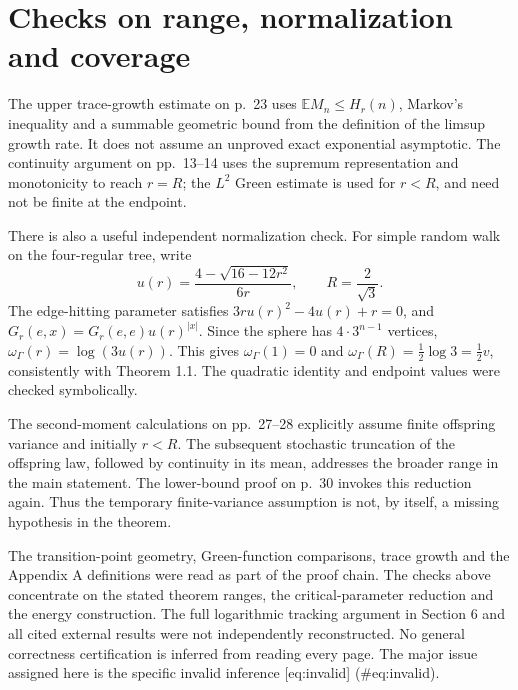 \documentclass[10pt]{article}
\begin{document}
\section*{Checks on range, normalization and coverage}
The upper trace-growth estimate on p. 23 uses \(\mathbb EM_n\leq H_r(n)\), Markov’s inequality and a summable geometric bound from the definition of the limsup growth rate. It does not assume an unproved exact exponential asymptotic. The continuity argument on pp. 13–14 uses the supremum representation and monotonicity to reach \(r=R\); the \(L^2\) Green estimate is used for \(r<R\), and need not be finite at the endpoint.\par
There is also a useful independent normalization check. For simple random walk on the four-regular tree, write \[u(r)=\frac{4-\sqrt{16-12r^2}}{6r},\qquad R=\frac2{\sqrt3}.\] The edge-hitting parameter satisfies \(3ru(r)^2-4u(r)+r=0\), and \(G_r(e,x)=G_r(e,e)u(r)^{|x|}\). Since the sphere has \(4\cdot3^{n-1}\) vertices, \(\omega_\Gamma(r)=\log(3u(r))\). This gives \(\omega_\Gamma(1)=0\) and \(\omega_\Gamma(R)=\frac12\log3=\frac12v\), consistently with Theorem 1.1. The quadratic identity and endpoint values were checked symbolically.\par
The second-moment calculations on pp. 27–28 explicitly assume finite offspring variance and initially \(r<R\). The subsequent stochastic truncation of the offspring law, followed by continuity in its mean, addresses the broader range in the main statement. The lower-bound proof on p. 30 invokes this reduction again. Thus the temporary finite-variance assumption is not, by itself, a missing hypothesis in the theorem.\par
The transition-point geometry, Green-function comparisons, trace growth and the Appendix A definitions were read as part of the proof chain. The checks above concentrate on the stated theorem ranges, the critical-parameter reduction and the energy construction. The full logarithmic tracking argument in Section 6 and all cited external results were not independently reconstructed. No general correctness certification is inferred from reading every page. The major issue assigned here is the specific invalid inference [eq:invalid] (\#eq:invalid).\par
\end{document}
